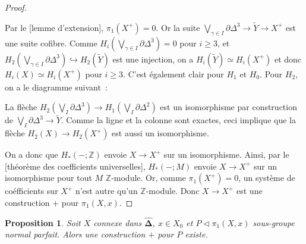 \documentclass{amsart}
\theoremstyle{plain}
\newtheorem{prop}[theo]{Proposition}
\theoremstyle{definition}
\theoremstyle{remark}
\newcommand{\ensemblenombre }[1]{\mathbb{#1}}
\newcommand{\Z}{\ensemblenombre{Z}}
\newcommand{\DEns}{\widehat{\mathbf{\Delta}}}
\newcommand{\ra}{\rightarrow}
\begin{document}
\begin{proof}
\begin{center}
\begin{tikzcd}[column sep = large, row sep = large]
    \end{tikzcd}
  \end{center}
  Par le [lemme d'extension], $\pi_1(X^+)=0$. Or la suite ${\bigvee_{\gamma\in I}\partial\Delta^3}\ra \tilde{Y}\ra X^+$ est une suite cofibre.
  Comme $H_i(\bigvee_{\gamma\in I}\partial\Delta^3)=0$ pour $i\geq 3$, et $H_2(\bigvee_{\gamma\in I}\partial\Delta^3)\hookrightarrow H_2(\tilde{Y})$
  est une injection, on a $H_i(\tilde{Y})\simeq H_i(X^+)$ et donc $H_i(X)\simeq H_i(X^+)$ pour $i\geq 3$. C'est également clair pour $H_1$ et $H_0$.
  Pour $H_2$, on a le diagramme suivant~:
  \begin{center}
  \end{center}
  La flèche $H_2(\bigvee_{I}\partial\Delta^3)\ra H_1(\bigvee_I\partial\Delta^2)$ est un isomorphisme par construction de
  $\bigvee_I\partial\Delta^3\ra \tilde{Y}$. Comme la ligne et la colonne sont exactes, ceci implique que la flèche
  $H_2(X)\ra H_2(X^+)$ est aussi un isomorphisme.

  On a donc que $H_*(-;\Z)$ envoie $X\ra X^+$ sur un isomorphisme. Ainsi, par le [théorème des coefficients universelles],
  $H_*(-;M)$ envoie $X\ra X^+$ sur un isomorphisme pour tout $M$ $\Z$-module. Or, comme $\pi_1(X^+)=0$, un système de coéfficients
  sur $X^+$ n'est autre qu'un $\Z$-module. Donc $X\ra X^+$ est une construction $+$ pour $\pi_1(X,x)$.
\end{proof}

\begin{prop}
  Soit $X$ connexe dans $\DEns$, $x\in X_0$ et $P\triangleleft \pi_1(X,x)$ sous-groupe normal parfait. Alors une construction $+$
  pour $P$ existe.
\end{prop}
\end{document}
